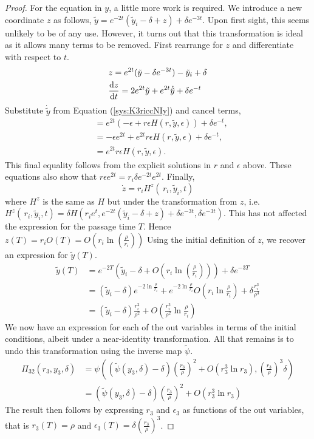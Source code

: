 \begin{proof}
	For the equation in $y$, a little more work is required. We introduce a new coordinate $z$ as follows, $\tilde{y}=e^{-2t}(\tilde{y}_i-\delta+z)+\delta  e^{-3t}$. Upon first sight, this seems unlikely to be of any use. However, it turns out that this transformation is ideal as it allows many terms to be removed. First rearrange for $z$ and differentiate with respect to $t$.
	\begin{align*}
	&z=e^{2t} (\tilde{y}-\delta e^{-3t})-\tilde{y}_i+\delta\\
	&\od{z}{t}= 2e^{2t}\tilde{y}+e^{2t}\dot{\tilde{y}}+\delta e^{-t}
	\end{align*}
	Substitute $\dot{\tilde{y}}$ from Equation (\ref{sys:K3riccNIy}) and cancel terms, 
	\begin{align*}
	&=e^{2t}(-\epsilon+r\epsilon H(r,\tilde{y},\epsilon))+\delta e^{-t},\\
	&=-\epsilon e^{2t}+e^{2t}r\epsilon  H(r,\tilde{y},\epsilon) + \delta e^{-t},\\
	&=e^{2t}r\epsilon  H(r,\tilde{y},\epsilon).
	\end{align*}
	This final equality follows from the explicit solutions in $r$ and $\epsilon$ above. These equations also show that $r\epsilon e^{2t} = r_i\delta e^{-2t}e^{2t}$. Finally,
	$$\dot{z} = r_iH^z(\,r_i,\tilde{y}_i,t)$$
	where $H^z$ is the same as $H$ but under the transformation from $z$, i.e. $H^z(\,r_i,\tilde{y}_i,t) = \delta H(r_ie^t,e^{-2t}(\tilde{y}_i-\delta+z)+\delta e^{-3t}, \delta e^{-3t})$. This has not affected the expression for the passage time $T$. Hence $z(T)=r_iO(T)=O(r_i\ln (\frac{\rho}{r_i}))$
	Using the initial definition of $z$, we recover an expression for $\tilde{y}(T)$.
	\begin{align*}
	\tilde{y}(T)&=e^{-2T}\left(\tilde{y}_i-\delta+O\left(r_i\ln\left(\frac{\rho}{r_i}\right)\right)\right)+\delta e^{-3T}\\
	&=(\tilde{y}_i-\delta)e^{-2\ln\frac{\rho}{r_i}}+e^{-2\ln\frac{\rho}{r_i}}O\left(r_i\ln\frac{\rho}{r_i}\right)+\delta \frac{r_i^3}{\rho^3}\\
	&=(\tilde{y}_i-\delta)\frac{r_i^2}{\rho^2}+O\left(\frac{r_i^3}{\rho^2}\ln\frac{\rho}{r_i}\right)
	\end{align*}
	We now have an expression for each of the out variables in terms of the initial conditions, albeit under a near-identity transformation. All that remains is to undo this transformation using the inverse map $\tilde{\psi}$.	\begin{align*}
	\Pi_{32}(r_3,y_3,\delta) &= \psi \left( \left( \tilde{\psi}(y_3,\delta)-\delta\right)\left(\frac{r_3}{\rho}\right)^2 + O(r_3^3\ln r_3), \left(\frac{r_3}{\rho}\right)^3\delta\right)\\
	&=(\tilde{\psi}(y_3,\delta)-\delta)\left( \frac{r_3}{\rho}\right)^2 +O(r_3^3\ln r_3)
	\end{align*}
	The result then follows by expressing $r_3$ and $\epsilon_3$ as functions of the out variables, that is $r_3(T)=\rho$ and $\epsilon_3(T)=\delta\left(\frac{r_3}{\rho}\right)^3$.
\end{proof}


